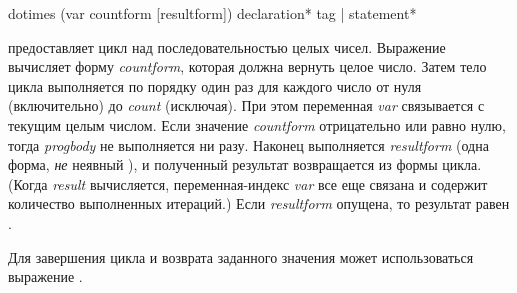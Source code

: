 \begin{defmac}
dotimes (var countform [resultform])
        {declaration}* {tag | statement}*

 предоставляет цикл над последовательностью целых чисел.
Выражение
вычисляет форму \emph{countform}, которая должна вернуть целое число. Затем
тело цикла выполняется по порядку один раз для каждого число от нуля (включительно) до
\emph{count} (исключая). При этом переменная \emph{var} связывается с текущим
целым числом. Если значение \emph{countform} отрицательно или равно нулю, тогда
\emph{progbody} не выполняется ни разу. Наконец выполняется \emph{resultform} (одна форма,
\emph{не} неявный ), и полученный результат возвращается из формы
цикла.
(Когда \emph{result} вычисляется, переменная-индекс \emph{var} все еще связана и
содержит количество выполненных итераций.)
Если \emph{resultform} опущена, то результат равен {\false}.

Для завершения цикла и возврата заданного значения может использоваться
выражение .


\end{defmac}
